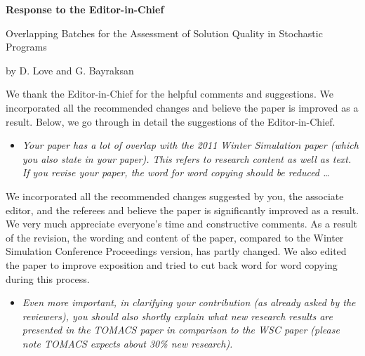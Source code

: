 \documentclass[11pt,notitlepage,onecolumn]{article}
\newcommand{\noi}{\noindent}
\begin{document}

\singlespacing

\baselineskip0.26in


\pagebreak

\begin{center}
\textbf{\Large Response to the Editor-in-Chief} \medskip

{\large Overlapping Batches for the Assessment of Solution Quality in Stochastic Programs} \medskip

{\footnotesize by D. Love and G. Bayraksan}
\end{center}

\bigskip


\noi
We thank the Editor-in-Chief for the helpful comments and suggestions. 
We incorporated all the recommended changes and believe the paper is improved as a result. 
Below, we go through in detail the suggestions of the Editor-in-Chief.\medskip


\begin{itemize}
\item[] \textit{Your paper has a lot of overlap with the 2011 Winter Simulation paper  (which you also state in your paper). 
This refers to research content as well as text. 
If you revise your paper, the word for word copying should be reduced \ldots}
\end{itemize}

\noindent  
We incorporated all the recommended changes suggested by you, the associate editor, and the referees and believe the paper is significantly improved as a result.
We very much appreciate everyone's time and constructive comments. 
As a result of the revision, the wording and content of the paper, compared to the Winter Simulation Conference Proceedings version, has partly changed.
We also edited the paper to improve exposition and tried to cut back word for word copying during this process.  
\medskip 

\begin{itemize}
\item[]\textit{Even more important, in clarifying your contribution (as already asked by the reviewers), you should also shortly explain what new research results are presented in the  TOMACS paper in comparison to the WSC paper (please note TOMACS expects about 30\% new research).}
\end{itemize}
\end{document}
